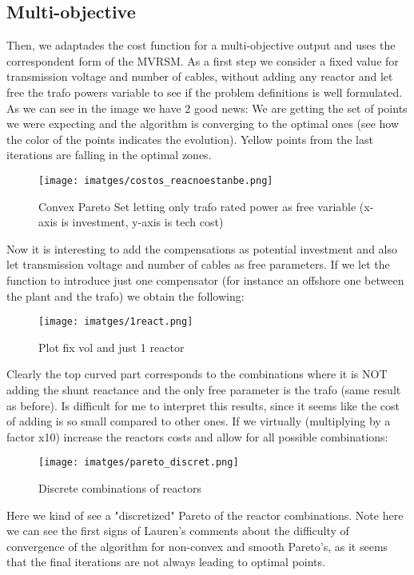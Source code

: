 \documentclass{article}
\begin{document}
\subsection{Multi-objective}
Then, we adaptades the cost function for a multi-objective output and uses the correspondent form of the MVRSM. As a first step we consider a fixed value for transmission voltage and number of cables, without adding any reactor and let free the trafo powers variable to see if the problem definitions is well formulated. As we can see in the image we have 2 good news: We are getting the set of points we were expecting and the algorithm is converging to the optimal ones (see how the color of the points indicates the evolution). Yellow points from the last iterations are falling in the optimal zones.
\newpage
\begin{figure}[h] %
    \centering
	\texttt{[image: imatges/costos\_reacnoestanbe.png]}
	\caption{Convex Pareto Set letting only trafo rated power as free variable (x-axis is investment, y-axis is tech cost)}
	\label{fig:binhkorn} %
\end{figure}
Now it is interesting to add the compensations as potential investment and also let transmission voltage and number of cables as free parameters. If we let the function to introduce just one compensator (for instance an offshore one between the plant and the trafo) we obtain the following:
\begin{figure}[h] %
    \centering
	\texttt{[image: imatges/1react.png]}
	\caption{Plot fix vol and just 1 reactor}
	\label{fig:binhkorn} %
\end{figure}
Clearly the top curved part corresponds to the combinations where it is NOT adding the shunt reactance and the only free parameter is the trafo (same result as before). Is difficult for me to interpret this results, since it seems like the cost of adding is so small compared to other ones. If we virtually (multiplying by a factor x10) increase the reactors costs and allow for all possible combinations:
\newpage
\begin{figure}[h] %
    \centering
	\texttt{[image: imatges/pareto\_discret.png]}
	\caption{Discrete combinations of reactors}
	\label{fig:binhkorn} %
\end{figure}
Here we kind of see a "discretized" Pareto of the reactor combinations. Note here we can see the first signs of Lauren's comments about the difficulty of convergence of the algorithm for non-convex and smooth Pareto's, as it seems that the final iterations are not always leading to optimal points.\\
\end{document}
